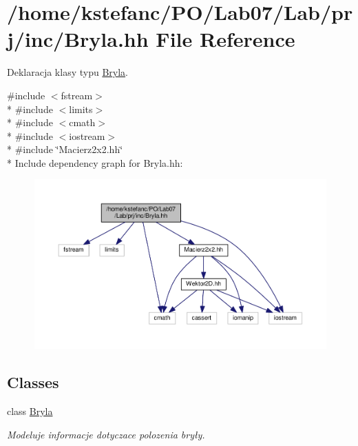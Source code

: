 \hypertarget{_bryla_8hh}{\section{/home/kstefanc/\+P\+O/\+Lab07/\+Lab/prj/inc/\+Bryla.hh File Reference}
\label{_bryla_8hh}
}


Deklaracja klasy typu \hyperlink{class_bryla}{Bryla}.  


{\ttfamily \#include $<$fstream$>$}\\*
{\ttfamily \#include $<$limits$>$}\\*
{\ttfamily \#include $<$cmath$>$}\\*
{\ttfamily \#include $<$iostream$>$}\\*
{\ttfamily \#include \char`\"{}Macierz2x2.\+hh\char`\"{}}\\*
Include dependency graph for Bryla.\+hh\+:\nopagebreak
\begin{figure}[H]
\begin{center}
\leavevmode
\includegraphics[width=350pt]{_bryla_8hh__incl}
\end{center}
\end{figure}
\subsection*{Classes}
\begin{DoxyCompactItemize}
\item 
class \hyperlink{class_bryla}{Bryla}
\begin{DoxyCompactList}\small\item\em Modeluje informacje dotyczace polozenia bryły. \end{DoxyCompactList}\end{DoxyCompactItemize}
